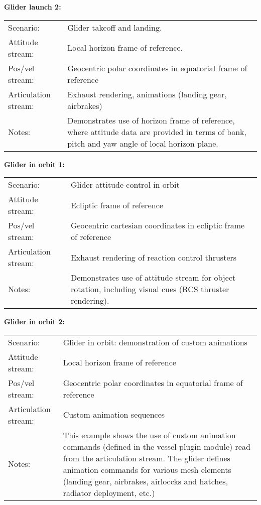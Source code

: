 \documentclass[Orbiter Technical Reference.tex]{subfiles}
\begin{document}
\noindent
\textbf{Glider launch 2:}
\begin{table}[H]
	\centering
	\begin{tabularx}{\textwidth}{ l X }
	Scenario: & Glider takeoff and landing.\\
	Attitude stream: & Local horizon frame of reference.\\
	Pos/vel stream: & Geocentric polar coordinates in equatorial frame of reference\\
	Articulation stream: & Exhaust rendering, animations (landing gear, airbrakes)\\
	Notes: & Demonstrates use of horizon frame of reference, where attitude data are provided in terms of bank, pitch and yaw angle of local horizon plane.\\
	\end{tabularx}
\end{table}

\noindent
\textbf{Glider in orbit 1:}
\begin{table}[H]
	\centering
	\begin{tabularx}{\textwidth}{ l X }
	Scenario: & Glider attitude control in orbit\\
	Attitude stream: & Ecliptic frame of reference\\
	Pos/vel stream: & Geocentric cartesian coordinates in ecliptic frame of reference\\
	Articulation stream: & Exhaust rendering of reaction control thrusters\\
	Notes: & Demonstrates use of attitude stream for object rotation, including visual cues (RCS thruster rendering).\\
	\end{tabularx}
\end{table}

\noindent
\textbf{Glider in orbit 2:}
\begin{table}[H]
	\centering
	\begin{tabularx}{\textwidth}{ l X }
	Scenario: & Glider in orbit: demonstration of custom animations\\
	Attitude stream: & Local horizon frame of reference\\
	Pos/vel stream: & Geocentric polar coordinates in equatorial frame of reference\\
	Articulation stream: & Custom animation sequences\\
	Notes: & This example shows the use of custom animation commands (defined in the vessel plugin module) read from the articulation stream. The glider defines animation commands for various mesh elements (landing gear, airbrakes, airloccks and hatches, radiator deployment, etc.)\\
	\end{tabularx}
\end{table}
\end{document}
